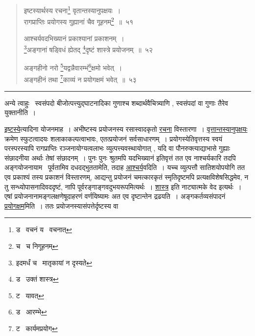 \documentclass[11pt, openany]{book}
\begin{document}
\newpage

\begin{quote}
{\na इष्टस्यार्थस्य रचना\renewcommand{\thefootnote}{1}\footnote{ड \textendash\ वचनं य \textendash\ वचनात्} वृतान्तस्यानुपक्षयः~।\\
रागप्राप्तिः प्रयोगस्य गुह्यानां चैव गूहनम्\renewcommand{\thefootnote}{2}\footnote{च \textendash\ च निगूहनम्}~॥~५१

आश्चर्यवदभिख्यानं प्रकाश्यानां प्रकाशनम्~।\\
\renewcommand{\thefootnote}{3}\footnote{इदमर्धं च \textendash\ मातृकायां न दृस्यते}अङ्गानां षड्विधं ह्येतद् \renewcommand{\thefootnote}{4}\footnote{ड \textendash\ उक्तं शास्त्र}दृष्टं शास्त्रे प्रयोजनम्~॥~५२

अङ्गहीनो नरो \renewcommand{\thefootnote}{5}\footnote{ट \textendash\ यावत्}यद्वन्नैवारम्भं\renewcommand{\thefootnote}{6}\footnote{ड \textendash\ आरम्भे}क्षमो भवेत्~।\\
अङ्गहीनं तथा \renewcommand{\thefootnote}{7}\footnote{ट \textendash\ कार्यमप्रयोग}काव्यं न प्रयोगक्षमं भवेत्~॥~५३}
\end{quote}

\hrule

\vspace{2mm}
अन्ये त्वाहुः \textendash\ स्वसंपदो बीजोत्पत्त्युद्घाटनादिका गुणाश्च शब्दार्थवैचित्र्याणि , स्वसंपदां वा गुणाः तैरेव युक्तानीति~।

\underline{इष्टस्ये}त्यादिना योजनमाह~। अभीष्टस्य प्रयोजनस्य रसास्वादकृतो \underline{रचना} विस्तारणा~। \underline{वृत्तान्तस्यानुपक्षयः} क्रमेण स्फुटत्वादयः शलाकाकल्पत्वाभावः, एतत्प्रयोजनं सर्वसाधारणम्~। प्रयोगस्येतिवृत्तस्य स्वयं परस्परस्यापि रागप्राप्तिः रञ्जनायोग्यत्वलाभः व्युत्पत्त्यवस्थायोगात् , यदि वा पौनरुक्त्याद्याभासे गुह्याः संछादनीया अर्थाः तेषां संछादनम्~। पुनः पुनः श्रुतमपि यदभिख्यानं इतिवृत्तं तत एव नाश्चर्यकारि तदपि अङ्गयोजनायाम \textendash\ पूर्वतामिव दधदद्भुततामेति, तदाह \underline{आश्चर्य}वदिति~। यच्च व्युत्पत्तौ सातिशयोपयोगि तत एव प्रकाश्यं तस्य प्रकाशनं विस्तारणम्, आद्यन्तु प्रयोजनं चमत्कारकृतं स्मृतिदृष्टमपि प्रत्यक्षविशेषसिद्धमेव, न तु सन्ध्योपासनादिवददृष्टं, नापि पूर्वरङ्गाङ्गवदुभयरूपमित्यर्थः~। \underline{शास्त्र} इति नाट्यात्मके वेद इत्यर्थः~। एषां प्रयोजनानामङ्गलक्षणेषूदाहरणं वर्णयिष्यामः अत एव दृष्टान्तेन द्रढयति~। अङ्गकर्तव्यसंपादनं \underline{प्रयोगक्षम}मिति~। ततः प्रयोजनस्यासंपत्तेर्दृष्टस्य वा

\newpage
\end{document}
